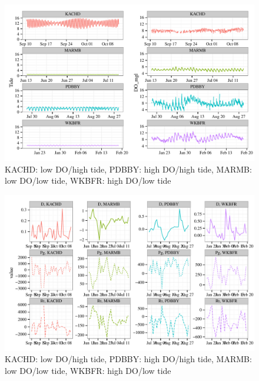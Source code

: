 \documentclass{article}\usepackage{graphicx, color}
\makeatletter
\def\maxwidth{ %
  \ifdim\Gin@nat@width>\linewidth
    \linewidth
  \else
    \Gin@nat@width
  \fi
}
\newenvironment{knitrout}{}{} %
\makeatother
\begin{document}
\clearpage

\begin{knitrout}
\color{fgcolor}\begin{figure}[]


{\centering \includegraphics[width=\maxwidth]{figure/case_wq} 

}

\caption[KACHD]{KACHD: low DO/high tide, PDBBY: high DO/high tide, MARMB: low DO/low tide, WKBFR: high DO/low tide\label{fig:case_wq}}
\end{figure}


\end{knitrout}

\begin{knitrout}
\color{fgcolor}\begin{figure}[]


{\centering \includegraphics[width=\maxwidth]{figure/case_wq_met} 

}

\caption[KACHD]{KACHD: low DO/high tide, PDBBY: high DO/high tide, MARMB: low DO/low tide, WKBFR: high DO/low tide\label{fig:case_wq_met}}
\end{figure}


\end{knitrout}
\end{document}
